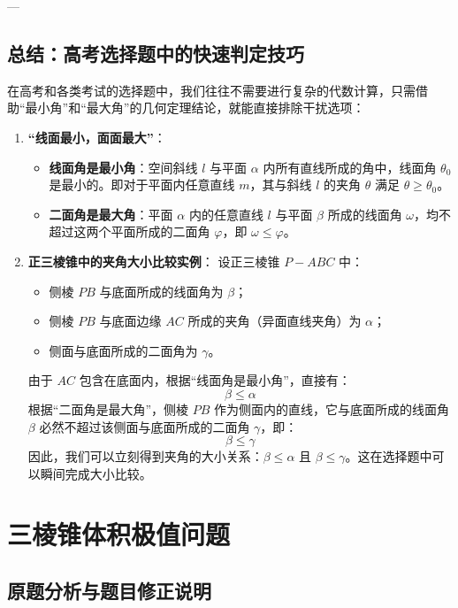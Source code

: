 \documentclass[11pt,a4paper]{ctexart}
\begin{document}
---

\subsection{总结：高考选择题中的快速判定技巧}

在高考和各类考试的选择题中，我们往往不需要进行复杂的代数计算，只需借助“最小角”和“最大角”的几何定理结论，就能直接排除干扰选项：

\begin{enumerate}
    \item \textbf{“线面最小，面面最大”}：
    \begin{itemize}
        \item \textbf{线面角是最小角}：空间斜线 $l$ 与平面 $\alpha$ 内所有直线所成的角中，线面角 $\theta_0$ 是最小的。即对于平面内任意直线 $m$，其与斜线 $l$ 的夹角 $\theta$ 满足 $\theta \ge \theta_0$。
        \item \textbf{二面角是最大角}：平面 $\alpha$ 内的任意直线 $l$ 与平面 $\beta$ 所成的线面角 $\omega$，均不超过这两个平面所成的二面角 $\varphi$，即 $\omega \le \varphi$。
    \end{itemize}
    \item \textbf{正三棱锥中的夹角大小比较实例}：
    设正三棱锥 $P-ABC$ 中：
    \begin{itemize}
        \item 侧棱 $PB$ 与底面所成的线面角为 $\beta$；
        \item 侧棱 $PB$ 与底面边缘 $AC$ 所成的夹角（异面直线夹角）为 $\alpha$；
        \item 侧面与底面所成的二面角为 $\gamma$。
    \end{itemize}
    由于 $AC$ 包含在底面内，根据“线面角是最小角”，直接有：
    \[ \beta \le \alpha \]
    根据“二面角是最大角”，侧棱 $PB$ 作为侧面内的直线，它与底面所成的线面角 $\beta$ 必然不超过该侧面与底面所成的二面角 $\gamma$，即：
    \[ \beta \le \gamma \]
    因此，我们可以立刻得到夹角的大小关系：$\beta \le \alpha$ 且 $\beta \le \gamma$。这在选择题中可以瞬间完成大小比较。
\end{enumerate}

\newpage
\section{三棱锥体积极值问题}

\subsection{原题分析与题目修正说明}
\end{document}
